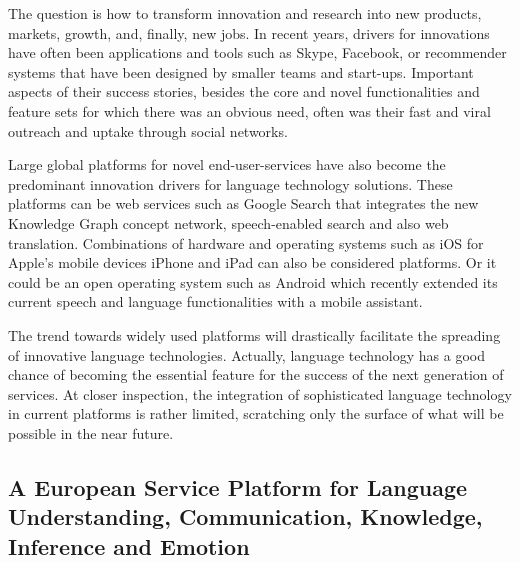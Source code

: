 \documentclass[10pt, plain]{../../metanetpaper}
\begin{document}
\begin{multicols}{2}
The question is how to transform innovation and research into new products, markets, growth, and, finally, new jobs. In recent years, drivers for innovations have often been applications and tools such as Skype, Facebook, or recommender systems that have been designed by smaller teams and start-ups. Important aspects of their success stories, besides the core and novel functionalities and feature sets for which there was an obvious need, often was their fast and viral outreach and uptake through social networks. 

Large global platforms for novel end-user-services have also become the predominant innovation drivers for language technology solutions. These platforms can be web services such as Google Search that integrates the new Knowledge Graph concept network, speech-enabled search and also web translation. Combinations of hardware and operating systems such as iOS for Apple's mobile devices iPhone and iPad can also be considered platforms. Or it could be an open operating system such as Android which recently extended its current speech and language functionalities with a mobile assistant.

The trend towards widely used platforms will drastically facilitate the spreading of innovative language technologies. Actually, language technology has a good chance of becoming the essential feature for the success of the next generation of services. At closer inspection, the integration of sophisticated language technology in current platforms is rather limited, scratching only the surface of what will be possible in the near future.

\subsection{A European Service Platform for Language Understanding, Communication, Knowledge, Inference and Emotion}
\label{sec:europ-service-platform}


%
%
%
%


\end{multicols}
\end{document}
